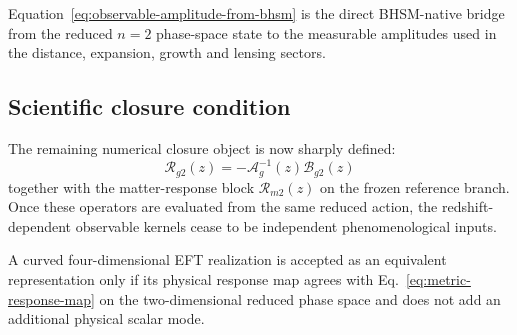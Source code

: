 Equation~\eqref{eq:observable-amplitude-from-bhsm} is the direct BHSM-native
bridge from the reduced $n=2$ phase-space state to the measurable amplitudes
used in the distance, expansion, growth and lensing sectors.

\subsection{Scientific closure condition}

The remaining numerical closure object is now sharply defined:
\begin{equation}
\boxed{
\mathcal R_{g2}(z)
=
-\mathcal A_g^{-1}(z)\mathcal B_{g2}(z)
}
\end{equation}
together with the matter-response block $\mathcal R_{m2}(z)$ on the frozen
reference branch.  Once these operators are evaluated from the same reduced
action, the redshift-dependent observable kernels cease to be independent
phenomenological inputs.

A curved four-dimensional EFT realization is accepted as an equivalent
representation only if its physical response map agrees with
Eq.~\eqref{eq:metric-response-map} on the two-dimensional reduced phase space
and does not add an additional physical scalar mode.
